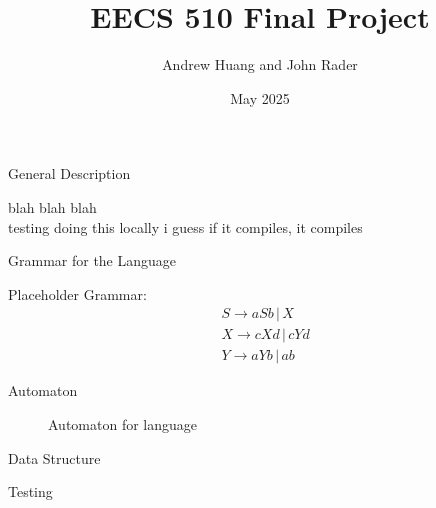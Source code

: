 \documentclass{article}
\title{EECS 510 Final Project}
\author{Andrew Huang and John Rader}
\date{May 2025}
\begin{document}
\maketitle


\begin{mylist}

\item General Description

blah blah blah \\
testing doing this locally i guess if it compiles, it compiles

\item Grammar for the Language

Placeholder Grammar:
\begin{align*}
&S \rightarrow aSb \, | \, X \\
&X \rightarrow cXd \, | \, cYd \\
&Y \rightarrow aYb \, | \, ab 
\end{align*}

\item Automaton

\begin{center}

\begin{figure}[ht]
    \centering
    \caption{Automaton for language}
    \label{fig1:automaton-for-language}
\end{figure}

\end{center}

\newpage
\item Data Structure

\item Testing

\end{mylist}
\end{document}
